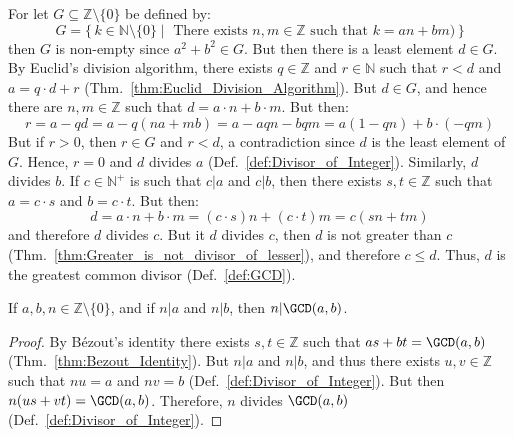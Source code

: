 \documentclass{article}                                                        %
\begin{document}
            \begin{bproof}
                For let $G\subseteq\mathbb{Z}\setminus\{0\}$ be defined by:
                \begin{equation}
                    G=\{\,k\in\mathbb{N}\setminus\{0\}\;|\;
                        \textrm{ There exists }n,m\in\mathbb{Z}
                        \textrm{ such that }k=an+bm\big)\,\}
                \end{equation}
                then $G$ is non-empty since $a^{2}+b^{2}\in{G}$. But then there
                is a least element $d\in{G}$. By Euclid's division algorithm,
                there exists $q\in\mathbb{Z}$ and $r\in\mathbb{N}$ such that
                $r<d$ and $a=q\cdot{d}+r$
                (Thm.~\ref{thm:Euclid_Division_Algorithm}). But $d\in{G}$, and
                hence there are $n,m\in\mathbb{Z}$ such that
                $d=a\cdot{n}+b\cdot{m}$. But then:
                \begin{equation}
                    r=a-qd=a-q(na+mb)=a-aqn-bqm=a(1-qn)+b\cdot(\minus{q}m)
                \end{equation}
                But if $r>0$, then $r\in{G}$ and $r<d$, a contradiction since
                $d$ is the least element of $G$. Hence, $r=0$ and $d$ divides
                $a$ (Def.~\ref{def:Divisor_of_Integer}). Similarly, $d$ divides
                $b$. If $c\in\mathbb{N}^{+}$ is such that $c|a$ and $c|b$, then
                there exists $s,t\in\mathbb{Z}$ such that $a=c\cdot{s}$ and
                $b=c\cdot{t}$. But then:
                \begin{equation}
                    d=a\cdot{n}+b\cdot{m}=(c\cdot{s})n+(c\cdot{t})m=c(sn+tm)
                \end{equation}
                and therefore $d$ divides $c$. But it $d$ divides $c$, then
                $d$ is not greater than $c$
                (Thm.~\ref{thm:Greater_is_not_divisor_of_lesser}), and therefore
                $c\leq{d}$. Thus, $d$ is the greatest common divisor
                (Def.~\ref{def:GCD}).
            \end{bproof}
            \begin{theorem}
                \label{thm:Divisor_of_AB_Divides_GCD}%
                If $a,b,n\in\mathbb{Z}\setminus\{0\}$, and if $n|a$ and $n|b$,
                then $n|\GCD(a,b)$.
            \end{theorem}
            \begin{proof}
                By B\'{e}zout's identity there exists $s,t\in\mathbb{Z}$ such
                that $as+bt=\GCD(a,b)$ (Thm.~\ref{thm:Bezout_Identity}). But
                $n|a$ and $n|b$, and thus there exists $u,v\in\mathbb{Z}$ such
                that $nu=a$ and $nv=b$ (Def.~\ref{def:Divisor_of_Integer}). But
                then $n(us+vt)=\GCD(a,b)$. Therefore, $n$ divides $\GCD(a,b)$
                (Def.~\ref{def:Divisor_of_Integer}).
            \end{proof}
\end{document}
